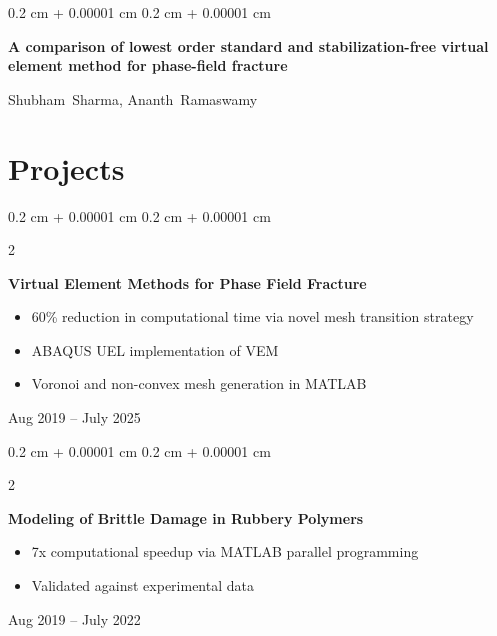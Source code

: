 \documentclass[10pt, letterpaper]{article}
\newenvironment{highlights}{
    \begin{itemize}[
        topsep=0.10 cm,
        parsep=0.10 cm,
        partopsep=0pt,
        itemsep=0pt,
        leftmargin=0.4 cm + 10pt
    ]
}{
    \end{itemize}
} %
\newenvironment{onecolentry}{
    \begin{adjustwidth}{
        0.2 cm + 0.00001 cm
    }{
        0.2 cm + 0.00001 cm
    }
}{
    \end{adjustwidth}
} %
\newenvironment{twocolentry}[2][]{
    \onecolentry
    \def\secondColumn{#2}
    \setcolumnwidth{\fill, 4.5 cm}
    \begin{paracol}{2}
}{
    \switchcolumn \raggedleft \secondColumn
    \end{paracol}
    \endonecolentry
} %
\begin{document}
        \vspace{0.2 cm}

        \begin{samepage}
            \begin{onecolentry}
                \textbf{A comparison of lowest order standard and stabilization-free virtual element method for phase-field fracture}

                \vspace{0.10 cm}

                \mbox{Shubham Sharma}, \mbox{Ananth Ramaswamy}
            \end{onecolentry}
        \end{samepage}


    
    \section{Projects}



        
        \begin{twocolentry}{
            Aug 2019 – July 2025
        }
            \textbf{Virtual Element Methods for Phase Field Fracture}
            \begin{highlights}
                \item 60\% reduction in computational time via novel mesh transition strategy
                \item ABAQUS UEL implementation of VEM
                \item Voronoi and non-convex mesh generation in MATLAB
            \end{highlights}
        \end{twocolentry}


        \vspace{0.2 cm}

        \begin{twocolentry}{
            Aug 2019 – July 2022
        }
            \textbf{Modeling of Brittle Damage in Rubbery Polymers}
            \begin{highlights}
                \item 7x computational speedup via MATLAB parallel programming
                \item Validated against experimental data
            \end{highlights}
        \end{twocolentry}
\end{document}
